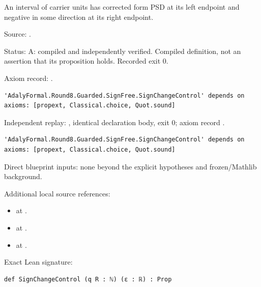 \begin{definition}[bp-075]
\label{bp-075}
\uses{}
\leanok
An interval of carrier units has corrected form PSD at its left endpoint and negative in some direction at its right endpoint.

\par Source: \texttt{}.
\par Status: A: compiled and independently verified. Compiled definition, not an assertion that its proposition holds. Recorded exit 0.
\par Axiom record: \texttt{}.
\begin{verbatim}
'AdalyFormal.Round8.Guarded.SignFree.SignChangeControl' depends on axioms: [propext, Classical.choice, Quot.sound]
\end{verbatim}
\par Independent replay: \texttt{}, identical declaration body, exit 0; axiom record \texttt{}.
\begin{verbatim}
'AdalyFormal.Round8.Guarded.SignFree.SignChangeControl' depends on axioms: [propext, Classical.choice, Quot.sound]
\end{verbatim}
\par Direct blueprint inputs: none beyond the explicit hypotheses and frozen/Mathlib background.
\par Additional local source references:
\begin{itemize}
\item \texttt{} at \texttt{}.
\item \texttt{} at \texttt{}.
\item \texttt{} at \texttt{}.
\end{itemize}
\par Exact Lean signature:
\begin{verbatim}
def SignChangeControl (q R : ℕ) (ε : ℝ) : Prop
\end{verbatim}
\end{definition}

